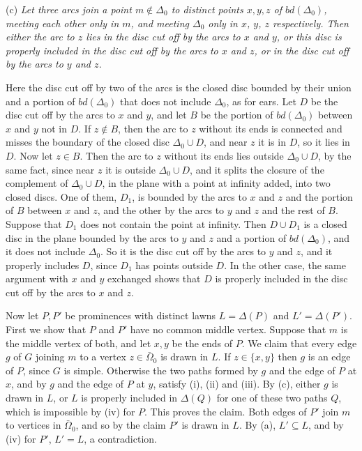 {\hspace*{12pt}(c) \textit{Let three arcs join a point $m \notin \Delta_0$ to distinct points
$x, y, z$ of $bd(\Delta_0)$, meeting each other only in $m$, and meeting $\Delta_0$ only in $x$, $y$,
$z$ respectively. Then either the arc to $z$ lies in the disc cut off by the arcs to $x$ and $y$, or
this disc is properly included in the disc cut off by the arcs to $x$ and $z$, or in the disc cut off
by the arcs to $y$ and $z$.}

Here the disc cut off by two of the arcs is the closed disc bounded by their union and a portion of
$bd(\Delta_0)$ that does not include $\Delta_0$, as for ears. Let $D$ be the disc cut off by the arcs
to $x$ and $y$, and let $B$ be the portion of $bd(\Delta_0)$ between $x$ and $y$ not in $D$. If
$z \notin B$, then the arc to $z$ without its ends is connected and misses the boundary of the
closed disc $\Delta_0 \cup D$, and near $z$ it is in $D$, so it lies in $D$. Now let $z \in B$. Then
the arc to $z$ without its ends lies outside $\Delta_0 \cup D$, by the same fact, since near $z$
it is outside $\Delta_0 \cup D$, and it splits the closure of the
complement of $\Delta_0 \cup D$, in the plane with a point at infinity added, into two closed discs.
One of them, $D_1$, is bounded by the arcs to $x$ and $z$ and the portion of $B$ between $x$ and $z$,
and the other by the arcs to $y$ and $z$ and the rest of $B$. Suppose that $D_1$ does not contain the
point at infinity. Then $D \cup D_1$ is a closed disc in the plane bounded by the arcs to $y$ and
$z$ and a portion of $bd(\Delta_0)$, and it does not include $\Delta_0$. So it is the disc cut off by
the arcs to $y$ and $z$, and it properly includes $D$, since $D_1$ has points outside $D$. In the
other case, the same argument with $x$ and $y$ exchanged shows that $D$ is properly included in the disc cut off by the arcs to $x$ and
$z$.

Now let $P, P'$ be prominences with distinct lawns $L = \Delta(P)$ and $L' = \Delta(P')$. First we
show that $P$ and $P'$ have no common middle vertex. Suppose that $m$ is the middle vertex of both,
and let $x, y$ be the ends of $P$. We claim that every edge $g$ of $G$ joining $m$ to a vertex
$z \in \bar{\Omega}_0$ is drawn in $L$. If $z \in \{x, y\}$ then $g$ is an edge of $P$, since $G$ is
simple. Otherwise the two paths formed by $g$ and the edge of $P$ at $x$, and by $g$ and the edge of
$P$ at $y$, satisfy (i), (ii) and (iii). By (c), either $g$ is drawn in $L$, or $L$ is properly
included in $\Delta(Q)$ for one of these two paths $Q$, which is impossible by (iv) for $P$. This
proves the claim. Both edges of $P'$ join $m$ to vertices in $\bar{\Omega}_0$, and so by the claim
$P'$ is drawn in $L$. By (a), $L' \subseteq L$, and by (iv) for $P'$, $L' = L$, a contradiction.

}
